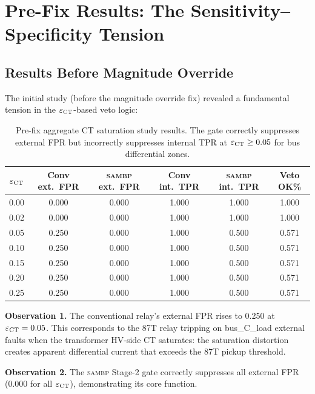 \documentclass[12pt,a4paper]{article}
\newcommand{\SAMBP}{\textsc{sambp}}
\newcommand{\epsct}{\varepsilon_{\rm CT}}
\begin{document}
\section{Pre-Fix Results: The Sensitivity–Specificity Tension}

\subsection{Results Before Magnitude Override}

The initial study (before the magnitude override fix) revealed a
fundamental tension in the $\epsct$-based veto logic:

\begin{table}[ht]
\centering
\caption{Pre-fix aggregate CT saturation study results.  The gate correctly
  suppresses external FPR but incorrectly suppresses internal TPR at
  $\epsct \geq 0.05$ for bus differential zones.}
\label{tab:prefix}
\begin{tabular}{cccccc}
\toprule
$\epsct$ & Conv ext.\ FPR & \SAMBP{} ext.\ FPR &
           Conv int.\ TPR & \SAMBP{} int.\ TPR & Veto OK\% \\
\midrule
0.00 & 0.000 & 0.000 & 1.000 & 1.000 & 1.000 \\
0.02 & 0.000 & 0.000 & 1.000 & 1.000 & 1.000 \\
0.05 & 0.250 & 0.000 & 1.000 & 0.500 & 0.571 \\
0.10 & 0.250 & 0.000 & 1.000 & 0.500 & 0.571 \\
0.15 & 0.250 & 0.000 & 1.000 & 0.500 & 0.571 \\
0.20 & 0.250 & 0.000 & 1.000 & 0.500 & 0.571 \\
0.25 & 0.250 & 0.000 & 1.000 & 0.500 & 0.571 \\
\bottomrule
\end{tabular}
\end{table}

\noindent\textbf{Observation 1.}  The conventional relay's external FPR
rises to 0.250 at $\epsct = 0.05$.  This corresponds to the 87T relay
tripping on bus\_C\_load external faults when the transformer HV-side CT
saturates: the saturation distortion creates apparent differential current
that exceeds the 87T pickup threshold.

\noindent\textbf{Observation 2.}  The \SAMBP{} Stage-2 gate correctly
suppresses all external FPR (0.000 for all $\epsct$), demonstrating its
core function.
\end{document}
